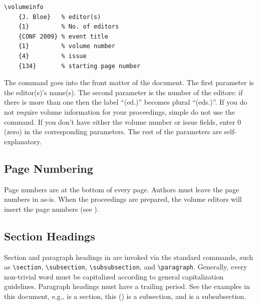 \documentclass{easychair}
\newcommand{\easychair}{\sf{easychair}}
\begin{document}
\begin{verbatim}
\volumeinfo
    {J. Bloe}   % editor(s)
    {1}         % No. of editors
    {CONF 2009} % event title
    {1}         % volume number
    {4}         % issue
    {134}       % starting page number
\end{verbatim}

\noindent
The command goes into the front matter of the document. The first parameter 
is the editor(s)'s name(s). 
The second parameter is the number of the editors: if there is more than one 
then the label ``(ed.)'' becomes plural ``(eds.)''.
If you do not require volume information for your proceedings, simple do not use the command.
If you don't have either the volume number or issue fields, enter $0$
(zero) in the corresponding parameters.
The rest of the parameters are self-explanatory.

\subsection{Page Numbering}
\label{sect:page-numbering}

Page numbers are at the bottom of every page. 
Authors must leave the page numbers in as-is. 
When the proceedings are prepared, the volume editors will insert the page 
numbers (see ).

\subsection{Section Headings}
\label{sect:section-headings}

Section and paragraph headings in {\easychair} are invoked via the standard 
commands, such as
\verb+\section+,
\verb+\subsection+,
\verb+\subsubsection+, and
\verb+\paragraph+.
Generally, every non-trivial word must be capitalized according to 
general capitalization guidelines. 
Paragraph headings must have a trailing period.
See the examples in this document, e.g.,  is a
section, this () is a subsection, and 
 is a subsubsection.
\end{document}
